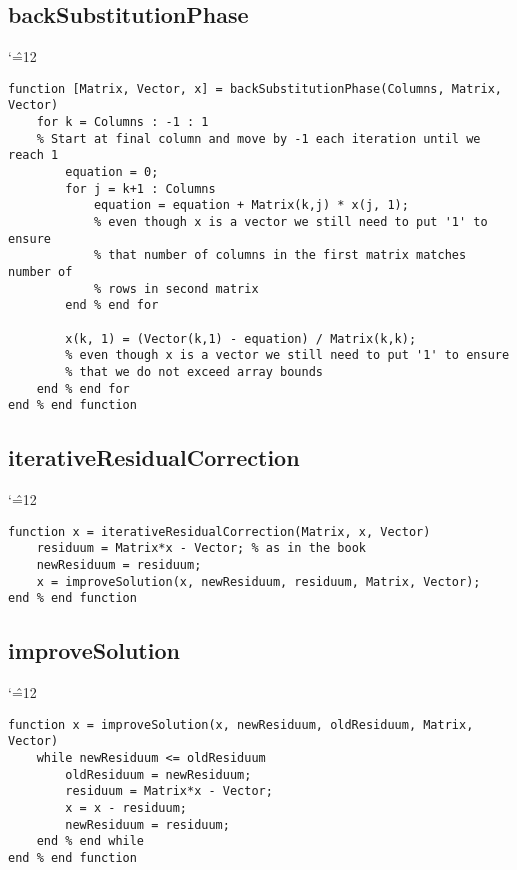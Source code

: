 \documentclass{report}
\newenvironment{simplechar}{%
   \catcode`\^=12
}{}
\begin{document}
\subsection{backSubstitutionPhase}
\begin{simplechar}
\begin{lstlisting}
function [Matrix, Vector, x] = backSubstitutionPhase(Columns, Matrix, Vector)
    for k = Columns : -1 : 1
    % Start at final column and move by -1 each iteration until we reach 1
        equation = 0;
        for j = k+1 : Columns
            equation = equation + Matrix(k,j) * x(j, 1);
            % even though x is a vector we still need to put '1' to ensure
            % that number of columns in the first matrix matches number of
            % rows in second matrix
        end % end for

        x(k, 1) = (Vector(k,1) - equation) / Matrix(k,k);
        % even though x is a vector we still need to put '1' to ensure
        % that we do not exceed array bounds
    end % end for
end % end function
\end{lstlisting}
\end{simplechar}

\subsection{iterativeResidualCorrection}
\begin{simplechar}
\begin{lstlisting}
function x = iterativeResidualCorrection(Matrix, x, Vector)
    residuum = Matrix*x - Vector; % as in the book
    newResiduum = residuum;
    x = improveSolution(x, newResiduum, residuum, Matrix, Vector);
end % end function
\end{lstlisting}
\end{simplechar}

\subsection{improveSolution}
\begin{simplechar}
\begin{lstlisting}
function x = improveSolution(x, newResiduum, oldResiduum, Matrix, Vector)
    while newResiduum <= oldResiduum
        oldResiduum = newResiduum;
        residuum = Matrix*x - Vector;
        x = x - residuum;
        newResiduum = residuum;
    end % end while
end % end function
\end{lstlisting}
\end{simplechar}
\end{document}
